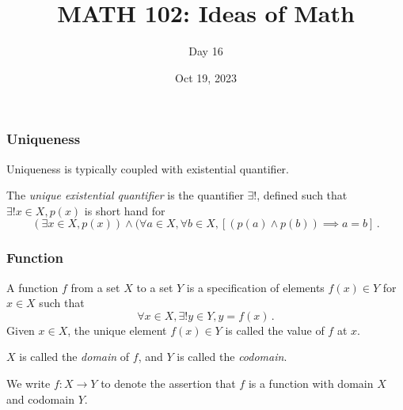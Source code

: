 \documentclass[aspectratio=169]{beamer}
\title{MATH 102: Ideas of Math}
\author{Day 16}
\date{Oct 19, 2023}
\begin{document}
\frame{\titlepage}


\begin{frame}
    \frametitle{Uniqueness}
    Uniqueness is typically coupled with existential quantifier.
    \begin{definition}
        The \emph{unique existential quantifier} is the quantifier $\exists!$, defined such that
        $\exists! x\in X, p(x)$ is short hand for
        \begin{equation*}
            (\exists x \in X, p(x)) \wedge (\forall a\in X, \forall b\in X, [(p(a)\wedge p(b)) \implies a = b] \,.
        \end{equation*}
    \end{definition}
\end{frame}
\begin{frame}
    \frametitle{ Function }

    \begin{definition}
    A function $f$ from a set $X$ to a set $Y$ is a specification of elements 
    $f(x) \in Y$ for $x\in X$ such that
    \begin{equation*}
        \forall x \in X, \exists! y \in Y, y = f(x) \,.
    \end{equation*}
    Given $x\in X$, the unique element $f(x)\in Y$ is called the value of $f$ at $x$.

    $X$ is called the \emph{domain} of $f$, and $Y$ is called the \emph{codomain}.

    We write $f:X\to Y$ to denote the assertion that $f$ is a function with domain $X$ and codomain $Y$.
    \end{definition}
\end{frame}
\end{document}
